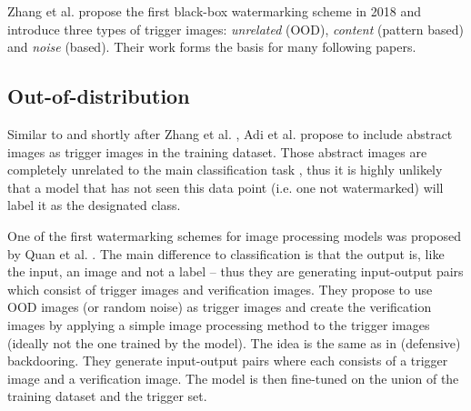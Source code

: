 Zhang et al. \cite{zhang_protecting_2018} propose the first black-box watermarking scheme in 2018 and introduce three types of trigger images: \textit{unrelated} (OOD), \textit{content} (pattern based) and \textit{noise} (based). %
Their work forms the basis for many following papers.

\subsection{Out-of-distribution}
Similar to and shortly after Zhang et al. \cite{zhang_protecting_2018}, Adi et al. \cite{adi_turning_2018} propose to include abstract images as trigger images in the training dataset. Those abstract images are completely unrelated to the main classification task%
, thus it is highly unlikely that a model that has not seen this data point (i.e. one not watermarked) will label it as the designated class. %

One of the first watermarking schemes for image processing models was proposed by Quan et al. \cite{quan_watermarking_2020}. The main difference to classification is that the output is, like the input, an image and not a label -- thus they are generating input-output pairs which consist of trigger images and verification images. They propose to use OOD images (or random noise) as trigger images and create the verification images by applying a simple image processing method to the trigger images (ideally not the one trained by the model). The idea is the same as in (defensive) backdooring. They generate input-output pairs where each consists of a trigger image and a verification image. The model is then fine-tuned on the union of the training dataset and the trigger set.


